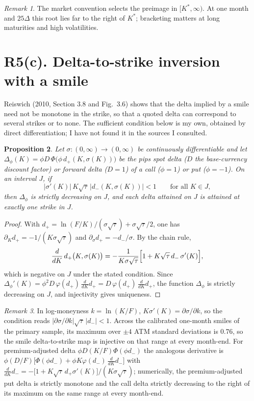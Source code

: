\documentclass[11pt]{article}
\newtheorem{proposition}{Proposition}
\theoremstyle{remark}
\newtheorem{remark}[proposition]{Remark}
\begin{document}
\begin{remark}
The market convention selects the preimage in $[K^*,\infty)$. At one month and $25\Delta$ this root lies far to the right of $K^*$; bracketing matters at long maturities and high volatilities.
\end{remark}

\section*{R5(c). Delta-to-strike inversion with a smile}

Reiswich (2010, Section 3.8 and Fig.~3.6) shows that the delta implied by a smile need not be monotone in the strike, so that a quoted delta can correspond to several strikes or to none. The sufficient condition below is my own, obtained by direct differentiation; I have not found it in the sources I consulted.

\begin{proposition}
Let $\sigma:(0,\infty)\to(0,\infty)$ be continuously differentiable and let $\Delta_\phi(K)=\phi D\,\Phi\bigl(\phi\,d_+(K,\sigma(K))\bigr)$ be the pips spot delta ($D$ the base-currency discount factor) or forward delta ($D=1$) of a call ($\phi=1$) or put ($\phi=-1$). On an interval $J$, if
\[
|\sigma'(K)|\,K\sqrt\tau\,|d_-(K,\sigma(K))|<1\qquad\text{for all }K\in J,
\]
then $\Delta_\phi$ is strictly decreasing on $J$, and each delta attained on $J$ is attained at exactly one strike in $J$.
\end{proposition}

\begin{proof}
With $d_+=\ln(F/K)/(\sigma\sqrt\tau)+\sigma\sqrt\tau/2$, one has $\partial_Kd_+=-1/(K\sigma\sqrt\tau)$ and $\partial_\sigma d_+=-d_-/\sigma$. By the chain rule,
\[
\frac{d}{dK}\,d_+\bigl(K,\sigma(K)\bigr)=-\frac{1}{K\sigma\sqrt\tau}\Bigl[1+K\sqrt\tau\,d_-\,\sigma'(K)\Bigr],
\]
which is negative on $J$ under the stated condition. Since $\Delta_\phi'(K)=\phi^2D\,\varphi(d_+)\,\frac{d}{dK}d_+=D\,\varphi(d_+)\,\frac{d}{dK}d_+$, the function $\Delta_\phi$ is strictly decreasing on $J$, and injectivity gives uniqueness.
\end{proof}

\begin{remark}
In log-moneyness $k=\ln(K/F)$, $K\sigma'(K)=\partial\sigma/\partial k$, so the condition reads $|\partial\sigma/\partial k|\sqrt\tau\,|d_-|<1$. Across the calibrated one-month smiles of the primary sample, its maximum over $\pm4$ ATM standard deviations is $0.76$, so the smile delta-to-strike map is injective on that range at every month-end. For premium-adjusted delta $\phi D(K/F)\Phi(\phi d_-)$ the analogous derivative is $\phi(D/F)\bigl[\Phi(\phi d_-)+\phi K\varphi(d_-)\,\tfrac{d}{dK}d_-\bigr]$ with $\tfrac{d}{dK}d_-=-\bigl[1+K\sqrt\tau\,d_+\sigma'(K)\bigr]/(K\sigma\sqrt\tau)$; numerically, the premium-adjusted put delta is strictly monotone and the call delta strictly decreasing to the right of its maximum on the same range at every month-end.
\end{remark}
\end{document}
